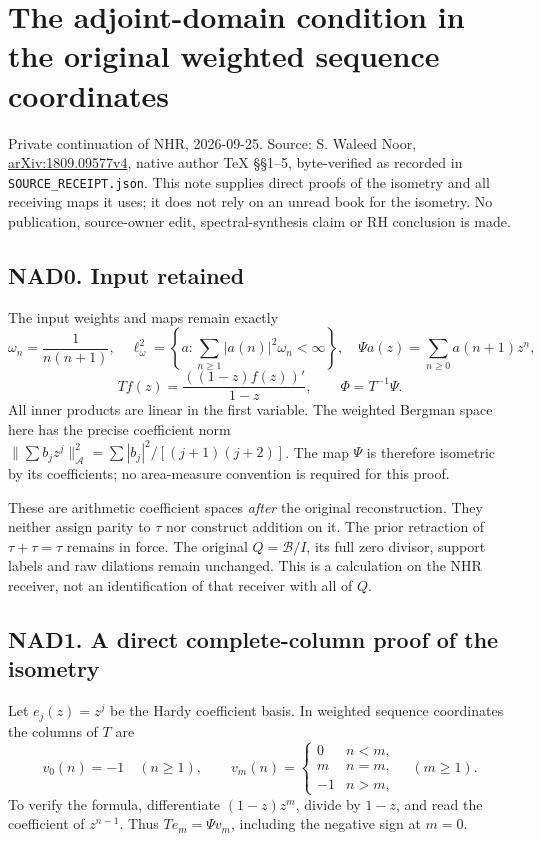 \section{The adjoint-domain condition in the original weighted sequence
coordinates}\label{the-adjoint-domain-condition-in-the-original-weighted-sequence-coordinates}

Private continuation of NHR, 2026-09-25. Source: S. Waleed Noor,
\href{https://arxiv.org/abs/1809.09577v4}{arXiv:1809.09577v4}, native
author TeX §§1--5, byte-verified as recorded in
\texttt{SOURCE\_RECEIPT.json}. This note supplies direct proofs of the
isometry and all receiving maps it uses; it does not rely on an unread
book for the isometry. No publication, source-owner edit,
spectral-synthesis claim or RH conclusion is made.

\subsection{NAD0. Input retained}\label{nad0.-input-retained}

The input weights and maps remain exactly \[
 \omega_n=\frac1{n(n+1)},\quad
 \ell^2_\omega=\left\{a:\sum_{n\ge1}|a(n)|^2\omega_n<\infty\right\},
 \quad\Psi a(z)=\sum_{n\ge0}a(n+1)z^n,
\] \[
 Tf(z)=\frac{((1-z)f(z))'}{1-z},\qquad\Phi=T^{-1}\Psi.
\] All inner products are linear in the first variable. The weighted
Bergman space here has the precise coefficient norm
\(\|\sum b_jz^j\|_{\mathcal A}^2=\sum |b_j|^2/[(j+1)(j+2)]\). The map
\(\Psi\) is therefore isometric by its coefficients; no area-measure
convention is required for this proof.

These are arithmetic coefficient spaces \emph{after} the original
reconstruction. They neither assign parity to \(\tau\) nor construct
addition on it. The prior retraction of \(\tau+\tau=\tau\) remains in
force. The original \(Q=\mathcal B/I\), its full zero divisor, support
labels and raw dilations remain unchanged. This is a calculation on the
NHR receiver, not an identification of that receiver with all of \(Q\).

\subsection{NAD1. A direct complete-column proof of the
isometry}\label{nad1.-a-direct-complete-column-proof-of-the-isometry}

Let \(e_j(z)=z^j\) be the Hardy coefficient basis. In weighted sequence
coordinates the columns of \(T\) are \[
 v_0(n)=-1\quad(n\ge1),
\qquad
 v_m(n)=\begin{cases}0&n<m,\\m&n=m,\\-1&n>m,\end{cases}
 \quad(m\ge1).
 \tag{NAD1.1}
\] To verify the formula, differentiate \((1-z)z^m\), divide by \(1-z\),
and read the coefficient of \(z^{n-1}\). Thus \(T e_m=\Psi v_m\),
including the negative sign at \(m=0\).

